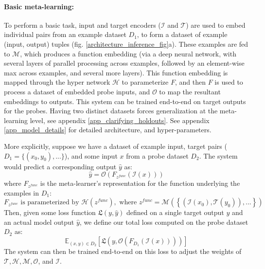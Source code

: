 \documentclass{article}
\begin{document}
\paragraph{Basic meta-learning:} To perform a basic task, input and target encoders ($\mathcal{I}$ and $\mathcal{T}$) are used to embed individual pairs from an example dataset \(D_1\), to form a dataset of example (input, output) tuples (fig. \ref{architecture_inference_fig}a). These examples are fed to $\mathcal{M}$, which produces a function embedding (via a deep neural network, with several layers of parallel processing across examples, followed by an element-wise max across examples, and several more layers). This function embedding is mapped through the hyper network $\mathcal{H}$ to parameterize $F$, and then $F$ is used to process a dataset of embedded probe inputs, and $\mathcal{O}$ to map the resultant embeddings to outputs. This system can be trained end-to-end on target outputs for the probes. Having two distinct datasets forces generalization at the meta-learning level, see appendix \ref{app_clarifying_holdouts}. See appendix \ref{app_model_details} for detailed architecture, and hyper-parameters. \par 
More explicitly, suppose we have a dataset of example input, target pairs ($D_1 = \{(x_0, y_0), ...\}$), and some input $x$ from a probe dataset $D_2$. The system would predict a corresponding output $\hat{y}$ as: 
\[\hat{y} = \mathcal{O}\left(F_{z^{func}}\left(\mathcal{I} \left(x\right)\right) \right)\]
where $F_{z^{func}}$ is the meta-learner's representation for the function underlying the examples in $D_1$:
\[F_{z^{func}} \text{ is parameterized by } \mathcal{H}\left(z^{func}\right), \text{ where } z^{func} = \mathcal{M}\left( \left\{\left(\mathcal{I}\left(x_0\right), \mathcal{T}\left(y_0\right) \right), ... \right\}\right)\]
Then, given some loss function $\mathfrak{L}(y, \hat{y})$ defined on a single target output $y$ and an actual model output $\hat{y}$, we define our total loss computed on the probe dataset $D_2$ as: 
\[\mathbb{E}_{(x, y)\in {D}_2} \left[ \mathfrak{L}\left(y, \mathcal{O}\left(F_{D_1}\left(\mathcal{I} \left(x\right)\right) \right)\right)\right]\]
The system can then be trained end-to-end on this loss to adjust the weights of \(\mathcal{T,H,M,O}\), and \(\mathcal{I}\).
\vspace{-0.25em}
\end{document}
